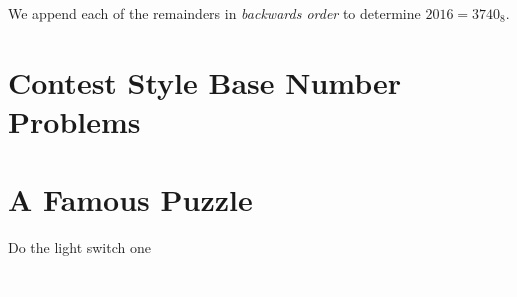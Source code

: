 We append each of the remainders in \textit{backwards order} to determine $2016=3740_8$.

\clearpage

\section{Contest Style Base Number Problems}  



\section{A Famous Puzzle}

Do the light switch one  


\clearpage
\thispagestyle{empty} %
\textcolor{white}{\cite{a:1}, \cite{me:1}}



\clearpage






